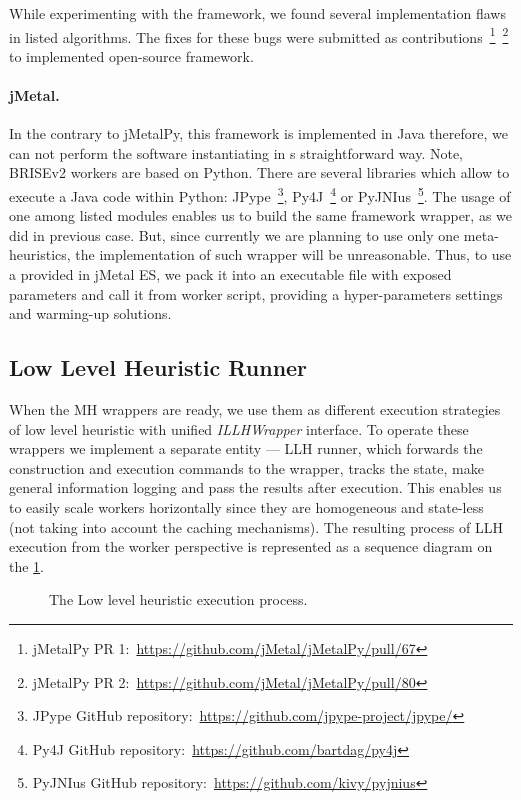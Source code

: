 While experimenting with the framework, we found several implementation flaws in listed algorithms. The fixes for these bugs were submitted as contributions~\footnote{jMetalPy PR 1:~\url{https://github.com/jMetal/jMetalPy/pull/67}}~\footnote{jMetalPy PR 2:~\url{https://github.com/jMetal/jMetalPy/pull/80}} to implemented open-source framework.

\paragraph{jMetal.} In the contrary to jMetalPy, this framework is implemented in Java therefore, we can not perform the software instantiating in s straightforward way. Note, BRISEv2 workers are based on Python. There are several libraries which allow to execute a Java code within Python: JPype~\footnote{JPype GitHub repository:~\url{https://github.com/jpype-project/jpype/}}, Py4J~\footnote{Py4J GitHub repository:~\url{https://github.com/bartdag/py4j}} or PyJNIus~\footnote{PyJNIus GitHub repository:~\url{https://github.com/kivy/pyjnius}}. The usage of one among listed modules enables us to build the same framework wrapper, as we did in previous case. But, since currently we are planning to use only one meta-heuristics, the implementation of such wrapper will be unreasonable. Thus, to use a provided in jMetal ES, we pack it into an executable file with exposed parameters and call it from worker script, providing a hyper-parameters settings and warming-up solutions.

\subsection{Low Level Heuristic Runner}
When the MH wrappers are ready, we use them as different execution strategies of low level heuristic with unified \emph{ILLHWrapper} interface. To operate these wrappers we implement a separate entity — LLH runner, which forwards the construction and execution commands to the wrapper, tracks the state, make general information logging and pass the results after execution. This enables us to easily scale workers horizontally since they are homogeneous and state-less (not taking into account the caching mechanisms). The resulting process of LLH execution from the worker perspective is represented as a sequence diagram on the \cref{impl:pict:llh sequence diagram}.

\begin{figure}
	\centering
	
	\caption{The Low level heuristic execution process.}
	\label{impl:pict:llh sequence diagram}
\end{figure}

